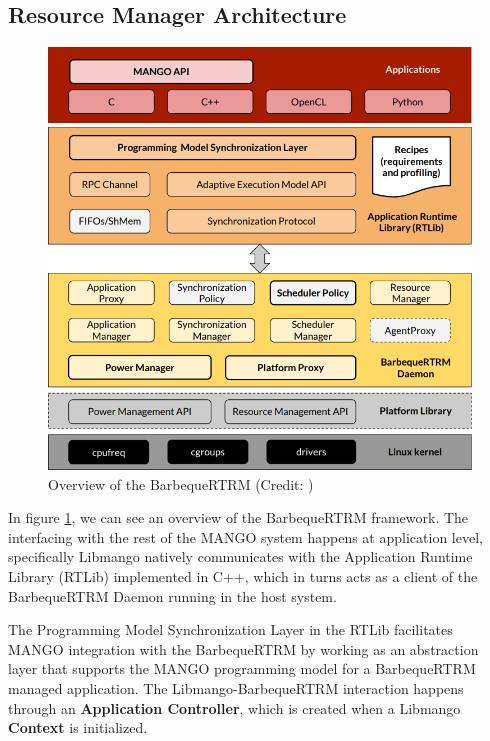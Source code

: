 \subsection{Resource Manager Architecture} \label{bbque}

\begin{figure}[ht]
    \centering
    \includegraphics[width=\textwidth]{img/barbecue-arch.png}
    \captionsetup{justification=centering}
    \caption{Overview of the BarbequeRTRM (Credit: \cite{mango_exploring_manycore_architectures})}
    \label{fig:barbecue-arch}
\end{figure}

In figure \ref{fig:barbecue-arch}, we can see an overview of the BarbequeRTRM framework. The interfacing with the rest of the MANGO system happens at application level, specifically Libmango natively communicates with the Application Runtime Library (RTLib) implemented in C++, which in turns acts as a client of the BarbequeRTRM Daemon running in the host system.

The Programming Model Synchronization Layer in the RTLib facilitates MANGO integration with the BarbequeRTRM by working as an abstraction layer that supports the MANGO programming model for a BarbequeRTRM managed application.
The Libmango-BarbequeRTRM interaction happens through an \textbf{Application Controller}, which is created when a Libmango \textbf{Context} is initialized.

